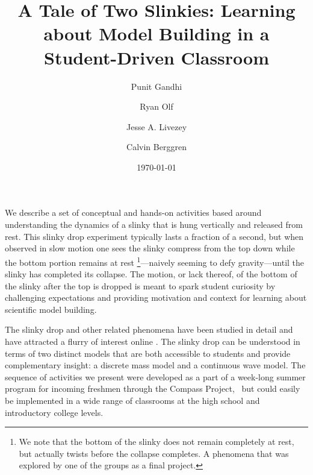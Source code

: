\documentclass[pre,preprint,superscriptaddress,longbibliography]{revtex4-1}
\begin{document}
\title{A Tale of Two Slinkies: Learning about Model Building in a Student-Driven Classroom}
\author{Punit  Gandhi}
\author{Ryan Olf}
\author{Jesse A. Livezey}
\author{Calvin Berggren}
\date{\today}

\maketitle

We describe a set of conceptual  and hands-on activities based around understanding the dynamics of a slinky that is hung vertically and released from rest.  
This slinky drop experiment typically lasts a fraction of a second, but when observed in slow motion one sees the slinky compress from the top down while the bottom portion remains at rest \footnote{We note that the bottom of the slinky does not remain completely at rest, but actually twists before the collapse completes.  A phenomena that was explored by one of the groups as a final project.}---naively seeming to defy gravity---until the slinky has completed its collapse.  The motion, or lack thereof, of the bottom of the slinky after the top is dropped is meant to spark student curiosity by challenging  expectations and providing motivation and context for learning about scientific model building. 



The slinky drop  and other related phenomena have been studied in detail\cite{calkin1993, newburgh1995, graham2001, aguirregabiria2007,unruh2011, cross2012} and have attracted a flurry of interest online \cite{veretasium2012}. The slinky drop  can be understood in terms of two distinct models that are both accessible to students and provide complementary insight: a discrete mass model and a continuous wave model.  
 The sequence of activities we present were developed as a part of a week-long summer program for incoming freshmen through the Compass Project,~\cite{albana2013,roth2012,drdf2013a,drdf2013b,gandhi2014} but could easily be implemented in a wide range of classrooms at the high school and introductory college levels.   %
\end{document}
